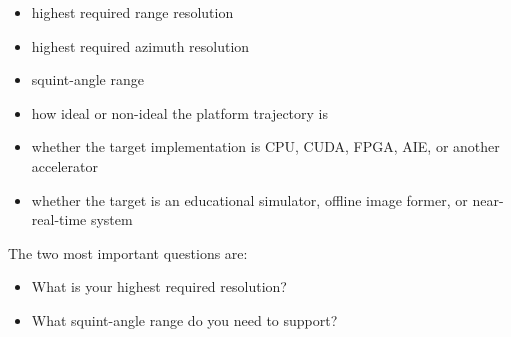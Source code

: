 \documentclass[journal,onecolumn]{IEEEtran}
\begin{document}
\begin{itemize}
  \item highest required range resolution
  \item highest required azimuth resolution
  \item squint-angle range
  \item how ideal or non-ideal the platform trajectory is
  \item whether the target implementation is CPU, CUDA, FPGA, AIE, or another accelerator
  \item whether the target is an educational simulator, offline image former, or near-real-time system
\end{itemize}
The two most important questions are:

\begin{itemize}
  \item What is your highest required resolution?
  \item What squint-angle range do you need to support?
\end{itemize}
\end{document}
